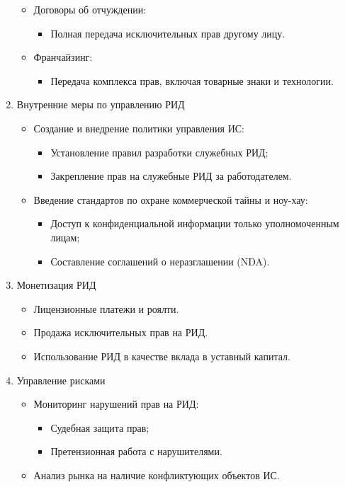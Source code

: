 \begin{enumerate}
\begin{itemize}
            \item Договоры об отчуждении:
            \begin{itemize}
                \item Полная передача исключительных прав другому лицу.
            \end{itemize}
            \item Франчайзинг:
            \begin{itemize}
                \item Передача комплекса прав, включая товарные знаки и технологии.
            \end{itemize}
        \end{itemize}
    \item  Внутренние меры по управлению РИД
        \begin{itemize}
            \item Создание и внедрение политики управления ИС:
            \begin{itemize}
                \item Установление правил разработки служебных РИД;
                \item Закрепление прав на служебные РИД за работодателем.
            \end{itemize}
            \item Введение стандартов по охране коммерческой тайны и ноу-хау:
            \begin{itemize}
                \item Доступ к конфиденциальной информации только уполномоченным лицам;
                \item Составление соглашений о неразглашении (NDA).
            \end{itemize}
        \end{itemize}
    \item Монетизация РИД
        \begin{itemize}
            \item Лицензионные платежи и роялти.
            \item Продажа исключительных прав на РИД.
            \item Использование РИД в качестве вклада в уставный капитал.
        \end{itemize}
    \item Управление рисками
        \begin{itemize}
            \item Мониторинг нарушений прав на РИД:
            \begin{itemize}
                \item Судебная защита прав;
                \item Претензионная работа с нарушителями.
            \end{itemize}
            \item Анализ рынка на наличие конфликтующих объектов ИС.
        \end{itemize}
    
\end{enumerate}






